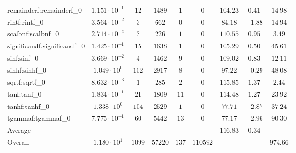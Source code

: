 \begin{tabular}{|l|c|c|c|c|c|c|c|c|}
remainderf:remainderf\_0     & $ 1.151 \cdot 10^{-1} $ & $ 12     $ & $ 1489  $ & $ 1   $ & $ 0      $ & $ 104.23      $ & $ 0.41    $ & $ 14.98   $ \\
rintf:rintf\_0               & $ 3.564 \cdot 10^{-2} $ & $ 3      $ & $ 662   $ & $ 0   $ & $ 0      $ & $ 84.18       $ & $ -1.88   $ & $ 14.94   $ \\
scalbnf:scalbnf\_0           & $ 2.714 \cdot 10^{-2} $ & $ 3      $ & $ 226   $ & $ 1   $ & $ 0      $ & $ 110.55      $ & $ 0.95    $ & $ 3.49    $ \\
significandf:significandf\_0 & $ 1.425 \cdot 10^{-1} $ & $ 15     $ & $ 1638  $ & $ 1   $ & $ 0      $ & $ 105.29      $ & $ 0.50    $ & $ 45.61   $ \\
sinf:sinf\_0                 & $ 3.669 \cdot 10^{-2} $ & $ 4      $ & $ 1462  $ & $ 9   $ & $ 0      $ & $ 109.02      $ & $ 0.83    $ & $ 12.11   $ \\
sinhf:sinhf\_0               & $ 1.049 \cdot 10^{0}  $ & $ 102    $ & $ 2917  $ & $ 8   $ & $ 0      $ & $ 97.22       $ & $ -0.29   $ & $ 48.08   $ \\
sqrtf:sqrtf\_0               & $ 8.632 \cdot 10^{-3} $ & $ 1      $ & $ 285   $ & $ 2   $ & $ 0      $ & $ 115.85      $ & $ 1.37    $ & $ 2.44    $ \\
tanf:tanf\_0                 & $ 1.834 \cdot 10^{-1} $ & $ 21     $ & $ 1809  $ & $ 11  $ & $ 0      $ & $ 114.48      $ & $ 1.27    $ & $ 23.92   $ \\
tanhf:tanhf\_0               & $ 1.338 \cdot 10^{0}  $ & $ 104    $ & $ 2529  $ & $ 1   $ & $ 0      $ & $ 77.71       $ & $ -2.87   $ & $ 37.24   $ \\
tgammaf:tgammaf\_0           & $ 7.775 \cdot 10^{-1} $ & $ 60     $ & $ 5442  $ & $ 13  $ & $ 0      $ & $ 77.17       $ & $ -2.96   $ & $ 90.30   $ \\
\hline
Average                      & $                     $ & $        $ & $       $ & $     $ & $        $ & $ 116.83      $ & $ 0.34    $ & $         $ \\
\hline
Overall                      & $ 1.180 \cdot 10^{1}  $ & $ 1099   $ & $ 57220 $ & $ 137 $ & $ 110592 $ & $             $ & $         $ & $ 974.66  $ \\
\hline
\end{tabular}
